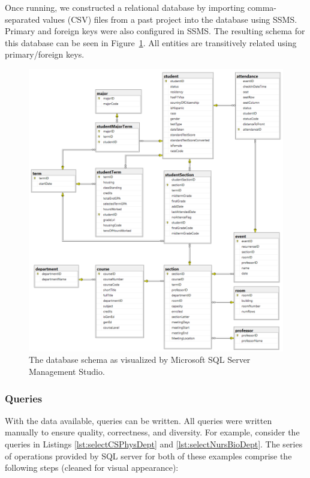 Once running, we constructed a relational database by importing comma-separated values (CSV) files from a past project \cite{hybl2023} into the database using SSMS. Primary and foreign keys were also configured in SSMS. The resulting schema for this database can be seen in Figure~\ref{fig:schema}. All entities are transitively related using primary/foreign keys.
\begin{figure}[ht]
  \centering
  \includegraphics[width=\textwidth]{figures/attendanceDBSchema.png}
  \caption{The database schema as visualized by Microsoft SQL Server Management Studio.}
  \label{fig:schema}
\end{figure}

\subsubsection{Queries}
With the data available, queries can be written. All queries were written manually to ensure quality, correctness, and diversity. For example, consider the queries in Listings \ref{lst:selectCSPhysDept} and \ref{lst:selectNursBioDept}. The series of operations provided by SQL server for both of these examples comprise the following steps (cleaned for visual appearance):

